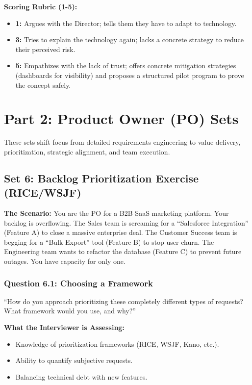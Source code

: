 \textbf{Scoring Rubric (1-5):}

\begin{itemize}
\tightlist
\item
  \textbf{1:} Argues with the Director; tells them they have to adapt to
  technology.
\item
  \textbf{3:} Tries to explain the technology again; lacks a concrete
  strategy to reduce their perceived risk.
\item
  \textbf{5:} Empathizes with the lack of trust; offers concrete
  mitigation strategies (dashboards for visibility) and proposes a
  structured pilot program to prove the concept safely.
\end{itemize}

\bigskip

\section{Part 2: Product Owner (PO)
Sets}\label{part-2-product-owner-po-sets}

These sets shift focus from detailed requirements engineering to value
delivery, prioritization, strategic alignment, and team execution.

\subsection{Set 6: Backlog Prioritization Exercise
(RICE/WSJF)}\label{set-6-backlog-prioritization-exercise-ricewsjf}

\textbf{The Scenario:} You are the PO for a B2B SaaS marketing platform.
Your backlog is overflowing. The Sales team is screaming for a
``Salesforce Integration'' (Feature A) to close a massive enterprise
deal. The Customer Success team is begging for a ``Bulk Export'' tool
(Feature B) to stop user churn. The Engineering team wants to refactor
the database (Feature C) to prevent future outages. You have capacity
for only one.

\subsubsection{Question 6.1: Choosing a
Framework}\label{question-6.1-choosing-a-framework}

``How do you approach prioritizing these completely different types of
requests? What framework would you use, and why?''

\textbf{What the Interviewer is Assessing:}

\begin{itemize}
\tightlist
\item
  Knowledge of prioritization frameworks (RICE, WSJF, Kano, etc.).
\item
  Ability to quantify subjective requests.
\item
  Balancing technical debt with new features.
\end{itemize}

